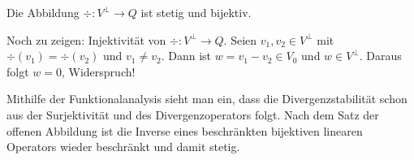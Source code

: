\begin{lemma}Die Abbildung $\div: V^{\perp} \to Q$ ist stetig und bijektiv.
\end{lemma}
\begin{beweis}
  Noch zu zeigen: Injektivität von $\div: V^{\perp} \to Q$. Seien $v_{1}, v_{2} \in V^{\perp}$ mit $\div(v_{1}) = \div(v_{2})$ und $v_{1} \neq v_{2}$. Dann ist $w = v_{1}- v_{2} \in V_{0}$ und $w \in V^{\perp}$. Daraus folgt $w = 0$, Widerspruch! 
\end{beweis}
\begin{bemerkung}
  Mithilfe der Funktionalanalysis sieht man ein, dass die Divergenzstabilität schon aus der Surjektivität und des Divergenzoperators folgt. Nach dem Satz der offenen Abbildung ist die Inverse eines beschränkten bijektiven linearen Operators wieder beschränkt und damit stetig. 
\end{bemerkung} 


